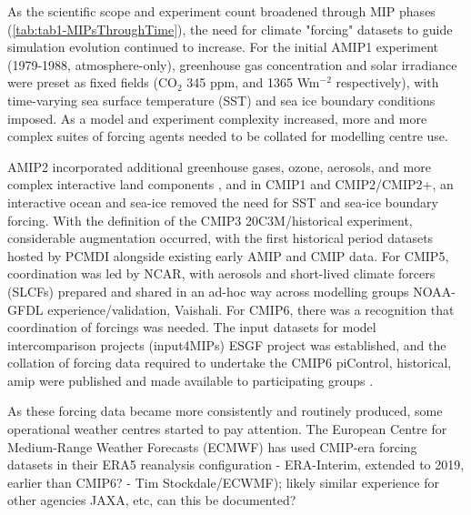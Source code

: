 \documentclass[gmd, preprint]{copernicus}
\newcommand{\mycomment}[1]{}
\def\cred#1{{\color{red}#1}}
\begin{document}
As the scientific scope and experiment count broadened through MIP phases (\autoref{tab:tab1-MIPsThroughTime}), the need for climate "forcing" datasets to guide simulation evolution continued to increase. For the initial AMIP1  experiment (1979-1988, atmosphere-only), greenhouse gas concentration and solar irradiance were preset as fixed fields (CO$_{2}$ 345 ppm, and 1365 Wm$^{-2}$ respectively), with time-varying sea surface temperature (SST) and sea ice boundary conditions imposed. As a model and experiment complexity increased, more and more complex suites of forcing agents needed to be collated for modelling centre use.

AMIP2 incorporated additional greenhouse gases, ozone, aerosols, and more complex interactive land components \citep{gleckler_amip_1996-1,liang_pcmdi_1997}, and in CMIP1 and CMIP2/CMIP2+, an interactive ocean and sea-ice removed the need for SST and sea-ice boundary forcing. With the definition of the CMIP3 20C3M/historical experiment, considerable augmentation occurred, with the first historical period datasets hosted by PCMDI alongside existing early AMIP and CMIP data. For CMIP5, coordination was led by NCAR, with aerosols and short-lived climate forcers (SLCFs) prepared and shared in an ad-hoc way across modelling groups \cred{NOAA-GFDL experience/validation, Vaishali}. For CMIP6, there was a recognition that coordination of forcings was needed. The input datasets for model intercomparison projects (input4MIPs) ESGF project was established, and the collation of forcing data required to undertake the CMIP6 piControl, historical, amip were published and made available to participating groups \citep{durack_toward_2018}.

\cred{As these forcing data became more consistently and routinely produced, some operational weather centres started to pay attention. The European Centre for Medium-Range Weather Forecasts (ECMWF) has used CMIP-era forcing datasets in their ERA5 reanalysis configuration - ERA-Interim, extended to 2019, earlier than CMIP6? - Tim Stockdale/ECWMF); likely similar experience for other agencies JAXA, etc, can this be documented?}

\mycomment{
CMIP3
https://pcmdi.llnl.gov/mips/cmip/ann_20c3m.html
PCMDI IPCC 4AR simulations and forcing Curt/Karl;
https://web.archive.org/web/20040706074446/http://www-pcmdi.llnl.gov/cmip/
https://web.archive.org/web/20040827091054/http://www-pcmdi.llnl.gov/cmip/
CMIP5
https://pcmdi.llnl.gov/mips/cmip5/forcing.html
Old information CMIP paths
/Users/durack1/sync/Docs/admin/LLNL/12/120607_PaulDurack_PCMDI-CMIP5DataMeeting_LLNL.pdf
/Users/durack1/sync/Docs/admin/LLNL/17/151202_covey1_CMIP1And2/151202_covey1-CMIP1Documentation.pdf
/Users/durack1/sync/Docs/admin/LLNL/17/151202_covey1_CMIP1And2/170530_gleckler1_CMIPPaths.pdf
}
\end{document}
